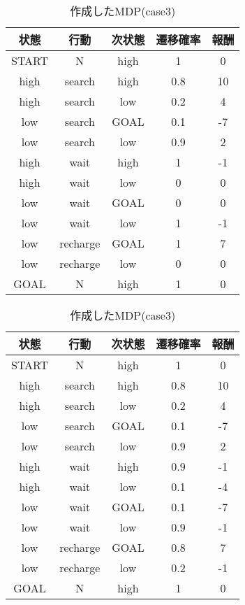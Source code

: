 \begin{table}
  \begin{minipage}[t]{0.45\hsize}
    \centering
    \caption{作成したMDP(case2)}
    \label{table:2}
      \begin{tabular}{|c|c|c|c|c|}
        \hline
        状態 & 行動 & 次状態 & 遷移確率 & 報酬\\
        \hline
        \hline
        START & N & high & 1 & 0 \\
        \hline
        high & search & high & 0.8 & 10 \\
        high & search & low & 0.2 & 4 \\
        \hline
        low & search & GOAL & 0.1 & -7 \\
        low & search & low & 0.9 & 2 \\
        \hline
        high & wait & high & 1 & -1 \\
        high & wait & low & 0 & 0 \\
        \hline
        low & wait & GOAL & 0 & 0 \\
        low & wait & low & 1 & -1 \\
        \hline
        low & recharge & GOAL & 1 & 7 \\
        low & recharge & low & 0 & 0 \\
        \hline
        GOAL & N & high & 1 & 0 \\
        \hline
      \end{tabular}
    \end{minipage}
    \begin{minipage}[t]{0.45\hsize}
      \centering
      \caption{作成したMDP(case3)}
      \label{table:3}
        \begin{tabular}{|c|c|c|c|c|}
          \hline
          状態 & 行動 & 次状態 & 遷移確率 & 報酬\\
          \hline
          \hline
          START & N & high & 1 & 0 \\
          \hline
          high & search & high & 0.8 & 10 \\
          high & search & low & 0.2 & 4 \\
          \hline
          low & search & GOAL & 0.1 & -7 \\
          low & search & low & 0.9 & 2 \\
          \hline
          high & wait & high & 0.9 & -1 \\
          high & wait & low & 0.1 & -4 \\
          \hline
          low & wait & GOAL & 0.1 & -7 \\
          low & wait & low & 0.9 & -1 \\
          \hline
          low & recharge & GOAL & 0.8 & 7 \\
          low & recharge & low & 0.2 & -1 \\
          \hline
          GOAL & N & high & 1 & 0 \\
          \hline
        \end{tabular}
      \end{minipage}
\end{table}


